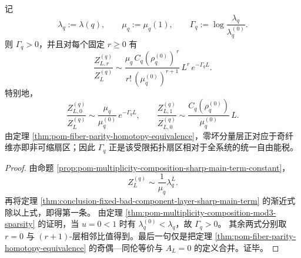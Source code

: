 \begin{corollary}[受限拓扑扇区的统一自由能税]\label{cor:conclusion-bad-component-free-energy-tax}
记
\[
\lambda_q:=\lambda(q),
\qquad
\mu_q:=\mu_q(1),
\qquad
\Gamma_q:=\log\frac{\lambda_q}{\lambda_q^{(0)}}.
\]
则 \(\Gamma_q>0\)，并且对每个固定 \(r\ge 0\) 有
\[
\frac{Z_{L,r}^{(q)}}{Z_L^{(q)}}
\sim
\frac{\mu_q\,C_q(\rho_q^{(0)})^{\,r}}{r!\,(\mu_q^{(0)})^{r+1}}
\,L^r\,e^{-\Gamma_q L}.
\]
特别地，
\[
\frac{Z_{L,0}^{(q)}}{Z_L^{(q)}}
\sim
\frac{\mu_q}{\mu_q^{(0)}}\,e^{-\Gamma_q L},
\qquad
\frac{Z_{L,1}^{(q)}}{Z_{L,0}^{(q)}}
\sim
\frac{C_q(\rho_q^{(0)})}{\mu_q^{(0)}}\,L.
\]
由定理 \ref{thm:pom-fiber-parity-homotopy-equivalence}，零坏分量层正对应于奇纤维亦即非可缩扇区；因此 \(\Gamma_q\) 正是该受限拓扑扇区相对于全系统的统一自由能税。
\end{corollary}
\begin{proof}
由命题 \ref{prop:pom-multiplicity-composition-sharp-main-term-constant}，
\[
Z_L^{(q)}\sim \frac{1}{\mu_q}\lambda_q^L.
\]
再将定理 \ref{thm:conclusion-fixed-bad-component-layer-sharp-main-term} 的渐近式除以上式，即得第一条。
由定理 \ref{thm:pom-multiplicity-composition-mod3-sparsity} 的证明，当 \(u=0<1\) 时有 \(\lambda_q^{(0)}<\lambda_q\)，故 \(\Gamma_q>0\)。
其余两式分别取 \(r=0\) 与 \((r+1)\)-层相邻比值得到。最后一句仅是把定理 \ref{thm:pom-fiber-parity-homotopy-equivalence} 的奇偶—同伦等价与 \(A_L=0\) 的定义合并。证毕。
\end{proof}

